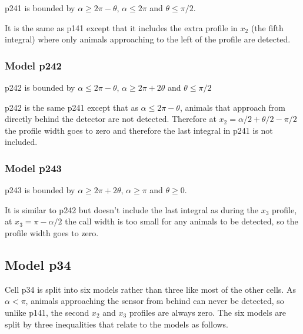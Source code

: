 p241 is bounded by $\alpha \ge 2\pi - \theta$, $\alpha \le 2\pi$ and $\theta \le \pi/2$.

It is the same as p141 except that it includes the extra profile in $x_2$ (the fifth integral) where only animals approaching to the left of the profile are detected.



\subsubsection{Model p242} \label{p242}

p242 is bounded by $\alpha \le 2\pi - \theta$, $\alpha \ge 2\pi + 2\theta$ and $\theta \le \pi/2$

p242 is the same p241 except that as $\alpha \le 2\pi - \theta$, animals that approach from directly behind the detector are not detected. Therefore at $x_2 = \alpha/2 + \theta/2 - \pi/2$ the profile width goes to zero and therefore the last integral in p241 is not included.





\subsubsection{Model p243} \label{p243}

p243 is bounded by $\alpha \ge 2\pi + 2\theta$, $\alpha \ge \pi$ and $\theta \ge 0$.

It is similar to p242 but doesn't include the last integral as during the $x_3$ profile, at $x_3 = \pi - \alpha/2$ the call width is too small for any animals to be detected, so the profile width goes to zero.







\subsection{Model p34} \label{p34}

Cell p34 is split into six models rather than three like most of the other cells. As $\alpha < \pi$, animals approaching the sensor from behind can never be detected, so unlike p141, the second $x_2$ and $x_3$ profiles are always zero. The six models are split by three inequalities that relate to the models as follows.

